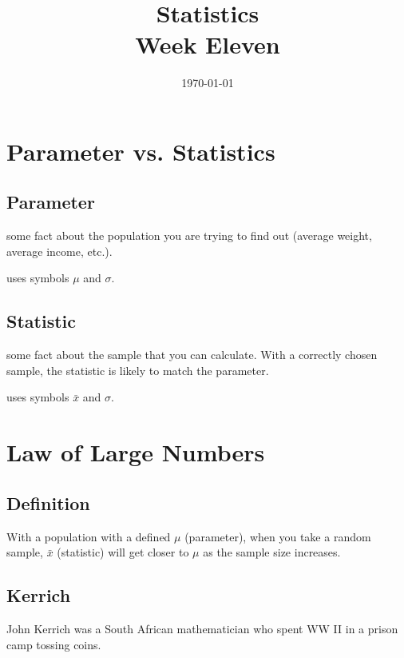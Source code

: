 \documentclass[letterpaper]{exam}
\title{Statistics \\ Week Eleven}
\date{\today}
\author{}
\begin{document}
  \maketitle
  \tableofcontents

  \section{Parameter vs. Statistics}
  \subsection{Parameter}
  \begin{itemize*} 
    \item some fact about the population you are trying to find out (average
      weight, average income, etc.). 
    \item uses symbols $\mu$ and $\sigma$.
  \end{itemize*}

  \subsection{Statistic}
  \begin{itemize*} 
    \item some fact about the sample that you can calculate. With a
      correctly chosen sample, the statistic is likely to match the
      parameter.
    \item uses symbols $\bar{x}$ and $\sigma$.
  \end{itemize*}

  \section{Law of Large Numbers}
  \subsection{Definition}
  With a population with a defined $\mu$ (parameter), when you take a random sample,
  $\bar{x}$ (statistic) will get closer to $\mu$ as the sample size increases.

  \subsection{Kerrich}
  John Kerrich was a South African mathematician who spent WW II in a prison camp
  tossing coins.
\end{document}
